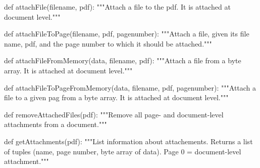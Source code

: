 def attachFile(filename, pdf):
    """Attach a file to the pdf. It is attached at document level."""

def attachFileToPage(filename, pdf, pagenumber):
    """Attach a file, given its file name, pdf, and the page number to which
    it should be attached."""

def attachFileFromMemory(data, filename, pdf):
    """Attach a file from a byte array. It is attached at document level."""

def attachFileToPageFromMemory(data, filename, pdf, pagenumber):
    """Attach a file to a given pag from a byte array. It is attached at
    document level."""

def removeAttachedFiles(pdf):
    """Remove all page- and document-level attachments from a document."""

def getAttachments(pdf):
    """List information about attachements. Returns a list of tuples (name,
    page number, byte array of data). Page 0 = document-level attachment."""
